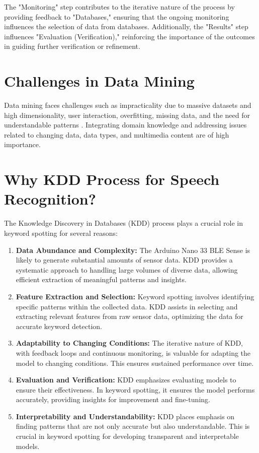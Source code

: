 The "Monitoring" step contributes to the iterative nature of the process by providing feedback to "Databases," ensuring that the ongoing monitoring influences the selection of data from databases. Additionally, the "Results" step influences "Evaluation (Verification)," reinforcing the importance of the outcomes in guiding further verification or refinement.


\section{Challenges in Data Mining}

Data mining faces challenges such as impracticality due to massive datasets and high dimensionality, user interaction, overfitting, missing data, and the need for understandable patterns \cite{Fayyad:1996}. Integrating domain knowledge and addressing issues related to changing data, data types, and multimedia content are of high importance. 


\section{Why KDD Process for Speech Recognition?}

The Knowledge Discovery in Databases (KDD) process plays a crucial role in keyword spotting for several reasons:



\begin{enumerate}
	\item \textbf{Data Abundance and Complexity:} The Arduino Nano 33 BLE Sense is likely to generate substantial amounts of sensor data. KDD provides a systematic approach to handling large volumes of diverse data, allowing efficient extraction of meaningful patterns and insights.
	
	\item \textbf{Feature Extraction and Selection:} Keyword spotting involves identifying specific patterns within the collected data. KDD assists in selecting and extracting relevant features from raw sensor data, optimizing the data for accurate keyword detection.
	
	\item \textbf{Adaptability to Changing Conditions:} The iterative nature of KDD, with feedback loops and continuous monitoring, is valuable for adapting the model to changing conditions. This ensures sustained performance over time.
	
	\item \textbf{Evaluation and Verification:} KDD emphasizes evaluating models to ensure their effectiveness. In keyword spotting, it ensures the model performs accurately, providing insights for improvement and fine-tuning.
	
	\item \textbf{Interpretability and Understandability:} KDD places emphasis on finding patterns that are not only accurate but also understandable. This is crucial in keyword spotting for developing transparent and interpretable models.
	
\end{enumerate}


